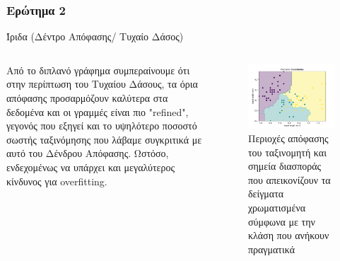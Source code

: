 \documentclass{beamer}
\begin{document}
\subsubsection{Ερώτημα 2}
\begin{frame}{Ίριδα (Δέντρο Απόφασης/ Τυχαίο Δάσος)}
    \begin{columns}

        Από το διπλανό γράφημα συμπεραίνουμε ότι στην περίπτωση του Τυχαίου Δάσους, τα όρια απόφασης προσαρμόζουν καλύτερα στα δεδομένα και οι γραμμές είναι πιο  "refined",  γεγονός που εξηγεί και το υψηλότερο ποσοστό σωστής ταξινόμησης που λάβαμε συγκριτικά με αυτό του Δένδρου Απόφασης. Ωστόσο, ενδεχομένως να υπάρχει και μεγαλύτερος κίνδυνος για overfitting.




    \begin{figure}
        \centering
            \includegraphics[width=\textwidth]{../plots/DB4.pdf}
            \caption{Περιοχές απόφασης του ταξινομητή και σημεία διασποράς που απεικονίζουν τα δείγματα χρωματισμένα σύμφωνα με την κλάση που ανήκουν πραγματικά}
            \label{fig:DB4}
    \end{figure}


\end{columns}
\end{frame}
\end{document}
